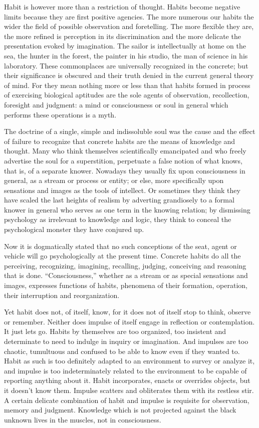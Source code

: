 \documentclass[12pt]{article}
\begin{document}
Habit is however more than a restriction of thought.
Habits become negative limits because they are first
positive agencies. The more numerous our habits the
wider the field of possible observation and foretelling.
The more flexible they are, the more refined is perception
in its discrimination and the more delicate the presentation
evoked by imagination. The sailor is intellectually
at home on the sea, the hunter in the forest,
the painter in his studio, the man of science in his laboratory.
These commonplaces are universally recognized
in the concrete; but their significance is obscured
and their truth denied in the current general theory
of mind. For they mean nothing more or less than
that habits formed in process of exercising biological
aptitudes are the sole agents of observation, recollection,
foresight and judgment: a mind or consciousness
or soul in general which performs these operations is
a myth.

The doctrine of a single, simple and indissoluble soul
was the cause and the effect of failure to recognize that
concrete habits are the means of knowledge and
thought. Many who think themselves scientifically
emancipated and who freely advertise the soul for a
superstition, perpetuate a false notion of what knows,
that is, of a separate knower. Nowadays they usually
fix upon consciousness in general, as a stream or process
or entity; or else, more specifically upon sensations and
images as the tools of intellect. Or sometimes they
think they have scaled the last heights of realism by
adverting grandiosely to a formal knower in general
who serves as one term in the knowing relation;
by dismissing psychology as irrelevant to knowledge
and logic, they think to conceal the psychological monster
they have conjured up.

Now it is dogmatically stated that no such conceptions
of the seat, agent or vehicle will go psychologically
at the present time. Concrete habits do all the
perceiving, recognizing, imagining, recalling, judging,
conceiving and reasoning that is done. ``Consciousness,''
whether as a stream or as special sensations and
images, expresses functions of habits, phenomena of
their formation, operation, their interruption and reorganization.

Yet habit does not, of itself, know, for it does not
of itself stop to think, observe or remember. Neither
does impulse of itself engage in reflection or contemplation.
It just lets go. Habits by themselves are too
organized, too insistent and determinate to need to
indulge in inquiry or imagination. And impulses are
too chaotic, tumultuous and confused to be able to
know even if they wanted to. Habit as such is too
definitely adapted to an environment to survey or analyze
it, and impulse is too indeterminately related to
the environment to be capable of reporting anything
about it. Habit incorporates, enacts or overrides objects,
but it doesn't know them. Impulse scatters and
obliterates them with its restless stir. A certain delicate
combination of habit and impulse is requisite for
observation, memory and judgment. Knowledge which
is not projected against the black unknown lives in the
muscles, not in consciousness.
\end{document}
